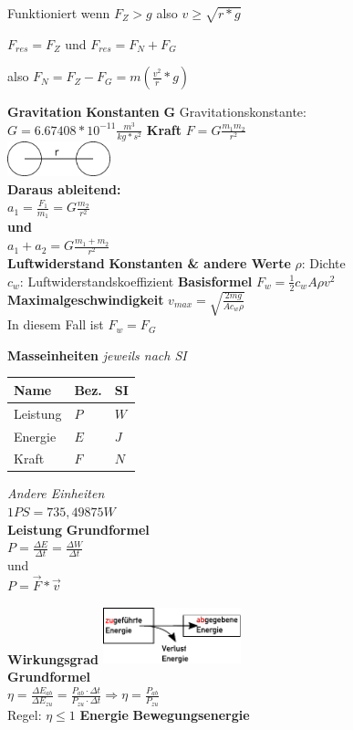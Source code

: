 \documentclass[a4paper,9pt]{article}
\begin{document}
\begin{multicols}{4}
	Funktioniert wenn $ F_Z > g $ also $ v \ge \sqrt{r * g} $
	
	$ F_{res} = F_Z $ und $ F_{res} = F_N + F_G $
	
	also $ F_N = F_Z - F_G = m(\frac{v^2}{r}*g) $
	
	\textbf{Gravitation}
	\textbf{Konstanten}
	\textbf{G} Gravitationskonstante:\\
	\(G=6.67408*10^{-11}\frac{m^3}{kg*s^2} \)
	\textbf{Kraft}
	\(F=G\frac{m_1 m_2}{r^2} \)\\
	\includegraphics[width=3cm]{radius}\\
	\textbf{Daraus ableitend:}\\
	\(a_1 = \frac{F_1}{m_1}=G\frac{m_2}{r^2} \)\\
	\textbf{und}\\
	\(a_1 + a_2 = G\frac{m_1 + m_2}{r^2}\)\\
	\textbf{Luftwiderstand}
	\textbf{Konstanten \& andere Werte}
	\(\rho\): Dichte\\
	\(c_w\): Luftwiderstandskoeffizient
	\textbf{Basisformel}
	\( F_w = \frac{1}{2} c_w A  \rho v^2 \)
	\textbf{Maximalgeschwindigkeit}
	\(v_{max} = \sqrt{\frac{2mg}{Ac_w\rho}} \)\\
	In diesem Fall ist \(F_w = F_G\)
	
	\textbf{Masseinheiten}
	\textit{jeweils nach SI}\\
	\begin{tabular}{|l|l|l|}
		\hline
		\textbf{Name} & \textbf{Bez.} & \textbf{SI} \\\hline
		Leistung & \(P\) & \(W\)\\\hline
		Energie & \(E\) & \(J\) \\\hline
		Kraft & \(F\) & \(N\)\\\hline
	\end{tabular}
	
	\textit{Andere Einheiten}\\
	\(1 PS = 735,49875 W\)\\
	
	
	\textbf{Leistung}
	\textbf{Grundformel}\\
	\(P = \frac{\Delta E}{\Delta t} = \frac{\Delta W}{\Delta t} \)\\
	und\\
	\(P = \vec{F} * \vec{v}\)
	
	\textbf{Wirkungsgrad}
	\includegraphics[width=4cm]{wirkungsgrad}\\
	\textbf{Grundformel}\\
	\(\eta = \frac{{\Delta {E_{ab}}}}{{\Delta {E_{zu}}}} = \frac{{{P_{ab}} \cdot \Delta t}}{{{P_{zu}} \cdot \Delta t}} \Rightarrow \eta = \frac{{{P_{ab}}}}{{{P_{zu}}}}\)
	\\
	Regel: \(\eta \leq 1\)
	\textbf{Energie}
	\textbf{Bewegungsenergie}
	

\end{multicols}
\end{document}
